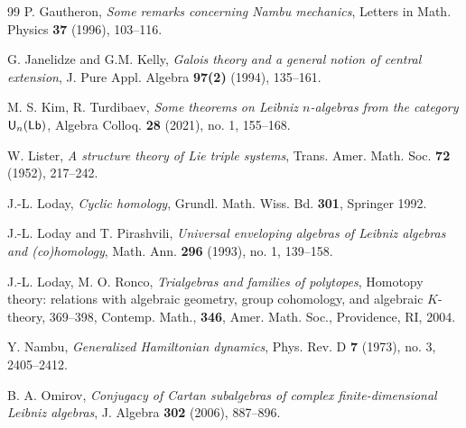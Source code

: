 \documentclass[12pt, reqno]{amsart}
\begin{document}
\begin{thebibliography}{99}
   {P. Gautheron}, {\it Some remarks concerning Nambu mechanics}, Letters in Math. Physics {\bf 37} (1996),  103--116.

     G. Janelidze and G.M. Kelly, {\it Galois theory and a general notion of central
extension}, J. Pure Appl. Algebra {\bf 97(2)} (1994),  135--161.

  M. S. Kim, R. Turdibaev, {\it  Some theorems on Leibniz $n$-algebras from the category ${\sf U}_n({\sf Lb})$}, Algebra Colloq. {\bf 28} (2021), no. 1, 155--168.


  { W. Lister}, {\it A structure theory of Lie triple systems}, Trans. Amer. Math. Soc. {\bf 72} (1952), 217--242.

  {J.-L. Loday}, {\it Cyclic homology}, Grundl. Math. Wiss. Bd. {\bf 301}, Springer 1992.

  {J.-L. Loday and T. Pirashvili}, {\it Universal enveloping algebras of Leibniz
 algebras and (co)homology},  Math. Ann. {\bf 296} (1993), no. 1,  139--158.

  {J.-L. Loday, M. O. Ronco}, {\it Trialgebras and families of polytopes}, Homotopy theory: relations
 with algebraic geometry, group cohomology, and algebraic $K$-theory, 369--398, Contemp. Math., {\bf 346},
 Amer. Math. Soc., Providence, RI, 2004.

 {Y. Nambu}, {\it Generalized Hamiltonian dynamics}, Phys. Rev. D   {\bf 7}  (1973), no. 3, 2405--2412.

 {B. A. Omirov}, {\it Conjugacy of Cartan subalgebras of complex finite-dimensional Leibniz algebras}, J. Algebra  {\bf 302}  (2006),  887--896.
\end{thebibliography}
\end{document}
